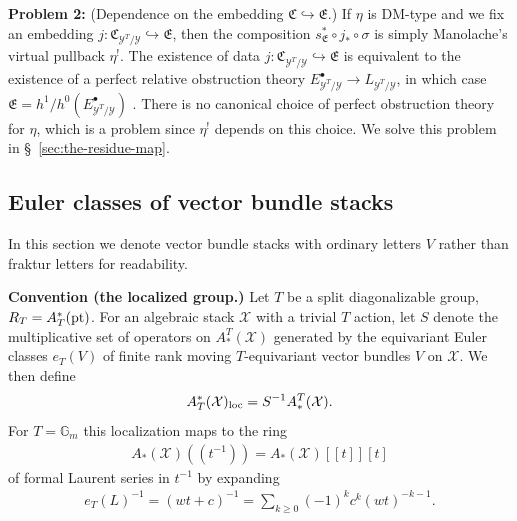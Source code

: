 \documentclass[12pt,dvipsnames]{amsart}
\begin{document}
\bigskip

\noindent\textbf{Problem 2:} (Dependence on the embedding \(\mathfrak C\hookrightarrow \mathfrak E\).) If \(\eta\) is DM-type and we fix an embedding \(j:\mathfrak C_{\mathcal Y^T/\mathcal Y}\hookrightarrow \mathfrak E\), then the composition \(s^*_{\mathfrak E}\circ j_*\circ \sigma\) is simply Manolache's virtual pullback \(\eta^!\). The existence of data \(j:\mathfrak C_{\mathcal Y^T/\mathcal Y}\hookrightarrow \mathfrak E\) is equivalent to the existence of a perfect relative obstruction theory \(E^\bullet_{\mathcal Y^T/\mathcal Y} \to L_{\mathcal Y^T/\mathcal Y}\), in which case \(\mathfrak E = h^1/h^0(E^\bullet_{\mathcal Y^T/\mathcal Y})\) \cite[Proposition 3.11]{manolache_VirtualPullbacks2012}. There is no canonical choice of perfect obstruction theory for \(\eta\), which is a problem since \(\eta^!\) depends on this choice. We solve this problem in \S~\ref{sec:the-residue-map}.

\subsection{Euler classes of vector bundle stacks}\label{rl-000S}\label{sec:euler-classes-of-vector-bundle-stacks}

In this section we denote vector bundle stacks with ordinary letters \(V\) rather than fraktur letters for readability.

\bigskip

\noindent\textbf{Convention (the localized group.)} Let \(T\) be a split diagonalizable group, \(R_T = A^*_T(\operatorname{pt})\). For an algebraic stack \(\mathcal X\) with a trivial \(T\) action, let \(S\) denote the multiplicative set of operators on \(A^T_*(\mathcal X)\) generated by the equivariant Euler classes \(e_T(V)\) of finite rank moving \(T\)-equivariant vector bundles \(V\) on \(\mathcal X\). We then define
\begin{align*}
  A_T^*(\mathcal X)_{\operatorname{loc}} = S^{-1}A^T_*(\mathcal X).
\end{align*}
For \(T = \mathbb G_m\) this localization maps to the ring
\begin{align*}
  A_*(\mathcal X)(\!(t^{-1})\!) = A_*(\mathcal X)[\![t]\!][t]
\end{align*}
of formal Laurent series in \(t^{-1}\) by expanding
\begin{align*}
  e_T(L)^{-1} = (wt + c)^{-1} = \sum_{k\geq 0}(-1)^kc^k(wt)^{-k-1}.
\end{align*}
\end{document}
